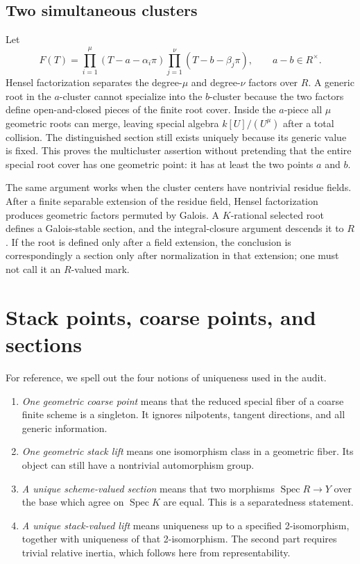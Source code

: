 \documentclass[11pt]{article}
\newcommand{\Spec}{\operatorname{Spec}}
\begin{document}
\subsection{Two simultaneous clusters}

Let
\[
 F(T)=\prod_{i=1}^{\mu}(T-a-\alpha_i\pi)
       \prod_{j=1}^{\nu}(T-b-\beta_j\pi),\qquad a-b\in R^\times.
\]
Hensel factorization separates the degree-$\mu$ and degree-$\nu$ factors
over $R$.  A generic root in the $a$-cluster cannot specialize into the
$b$-cluster because the two factors define open-and-closed pieces of the
finite root cover.  Inside the $a$-piece all $\mu$ geometric roots can merge,
leaving special algebra $k[U]/(U^\mu)$ after a total collision.  The
distinguished section still exists uniquely because its generic value is
fixed.  This proves the multicluster assertion without pretending that the
entire special root cover has one geometric point: it has at least the two
points $a$ and $b$.

The same argument works when the cluster centers have nontrivial residue
fields.  After a finite separable extension of the residue field, Hensel
factorization produces geometric factors permuted by Galois.  A
$K$-rational selected root defines a Galois-stable section, and the
integral-closure argument descends it to $R$.  If the root is defined only
after a field extension, the conclusion is correspondingly a section only
after normalization in that extension; one must not call it an $R$-valued
mark.

\section{Stack points, coarse points, and sections}

For reference, we spell out the four notions of uniqueness used in the
audit.

\begin{enumerate}
\item \emph{One geometric coarse point} means that the reduced special fiber
of a coarse finite scheme is a singleton.  It ignores nilpotents, tangent
directions, and all generic information.
\item \emph{One geometric stack lift} means one isomorphism class in a
geometric fiber.  Its object can still have a nontrivial automorphism group.
\item \emph{A unique scheme-valued section} means that two morphisms
$\Spec R\to Y$ over the base which agree on $\Spec K$ are equal.  This is a
separatedness statement.
\item \emph{A unique stack-valued lift} means uniqueness up to a specified
2-isomorphism, together with uniqueness of that 2-isomorphism.  The second
part requires trivial relative inertia, which follows here from
representability.
\end{enumerate}
\end{document}
